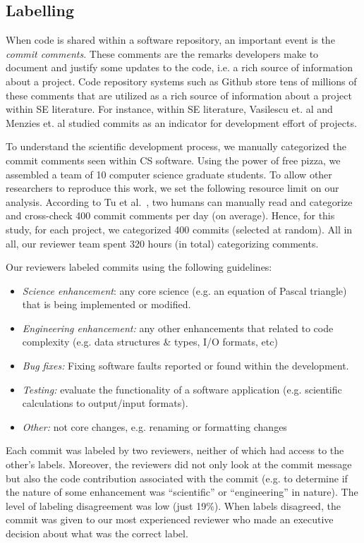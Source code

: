 \documentclass[sigconf]{acmart}
\newcommand{\bi}{\begin{itemize}}
\newcommand{\ei}{\end{itemize}}
\begin{document}
     
 \subsection{Labelling}
 When code is shared
within a software repository, an important event is the {\em commit comments}. These comments are the remarks developers make to document and justify some updates to the code, i.e. a rich source of information about a project. Code repository systems such as Github store tens of millions of these comments that are utilized as a rich source of information about a project within SE literature. For instance, within SE literature,  Vasilescu et. al \cite{vasilescu16_limit} and Menzies et. al \cite{xia2019sequential} studied commits as an indicator for development effort of projects.


To understand the scientific development process, we manually categorized the commit comments seen within CS
software. 
Using the power of free pizza, we assembled a team of 10 computer science 
graduate students.
To allow other researchers to reproduce this work, we set
the following
resource limit on our analysis.
According to Tu et al.~\cite{tu2019better}, two humans can manually read and categorize
and cross-check 400 commit comments per day (on average).
Hence, for this study, for each project, we categorized 400 commits
(selected at random). 
All in all, our
reviewer team spent 320 hours (in total) categorizing comments.



 Our  reviewers
labeled commits using the following
guidelines:
\bi
\item {\em Science enhancement}: any core science (e.g. an equation of Pascal triangle) that is being implemented or modified.
\item {\em Engineering enhancement:} any other enhancements that related to code complexity (e.g. data structures \& types, I/O formats, etc) 
\item {\em Bug fixes:} Fixing software faults reported or found within the development. 
\item {\em Testing: } evaluate the functionality of a software application (e.g. scientific calculations to output/input formats).
\item
{\em Other:} not core changes, e.g. renaming or formatting changes
\ei

 

Each commit was labeled by two reviewers,
neither of which had access to the other's labels. Moreover, the reviewers did not only look at the commit message but also the code contribution associated with the commit (e.g. to determine if the nature of some enhancement was 
``scientific'' or ``engineering'' in nature). The level of
labeling disagreement was low (just 19\%). When labels disagreed, the commit was given to our most experienced reviewer who made an executive decision about what
was the correct label.
\end{document}
